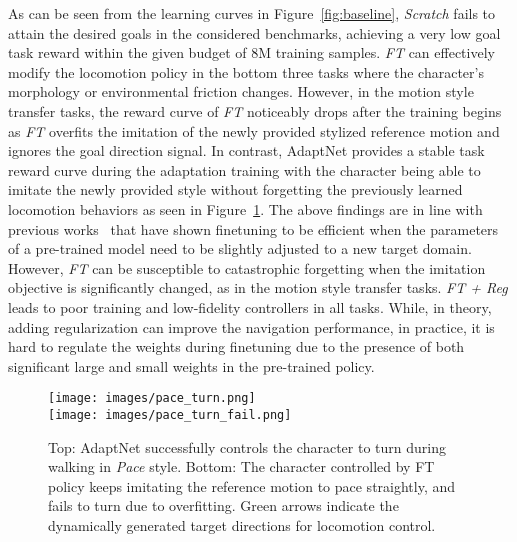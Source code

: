 As can be seen from the learning curves in Figure~\ref{fig:baseline}, %
\emph{Scratch} 
fails to attain the desired goals in the considered benchmarks, achieving a very low goal task reward within the given budget of 8M training samples.
\emph{FT} can effectively modify the locomotion policy in the bottom three tasks where the character's morphology or environmental friction changes. %
However, in the motion style transfer tasks, the reward curve of \emph{FT} noticeably drops after the training begins
as
\emph{FT} overfits the imitation of the newly provided stylized reference motion and ignores the goal direction signal.  %
In contrast, AdaptNet provides a stable task reward curve during the adaptation training with the character being able to imitate the newly provided style without forgetting the previously learned locomotion behaviors as seen in  Figure~\ref{fig:baseline_fail}. 
The above findings are in line with previous works~\cite{MCPPeng19,rusu2016progressive} that have shown finetuning to be efficient when the parameters of a pre-trained model need to be slightly adjusted to a new target domain.  
However, \emph{FT} can be susceptible to catastrophic forgetting
when the imitation objective is significantly changed, as in the motion style transfer tasks.
\emph{FT + Reg} leads to poor training and low-fidelity controllers in all tasks. While, in theory, adding regularization can improve the navigation performance, in practice, it is hard to regulate the weights during finetuning due to the presence of both significant large and small weights in the pre-trained policy.   %






\begin{figure}[t]
    \centering
    \texttt{[image: images/pace\_turn.png]}\\\vspace{0.05cm}
    \texttt{[image: images/pace\_turn\_fail.png]}
    \caption{Top: AdaptNet successfully controls the character to turn during walking in \textit{Pace} style. Bottom: The character controlled by FT policy keeps imitating the reference motion to pace straightly, and fails to turn due to overfitting. Green arrows indicate the dynamically generated target directions for locomotion control.}
    \label{fig:baseline_fail}
\end{figure}


